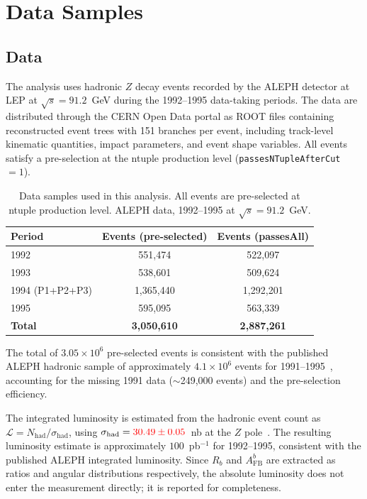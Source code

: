 \documentclass[11pt,a4paper]{article}
\newcommand{\external}[1]{\textcolor{red}{#1}}
\begin{document}
\section{Data Samples}
\label{sec:data}

\subsection{Data}

The analysis uses hadronic $Z$ decay events recorded by the ALEPH
detector at LEP at $\sqrt{s} = 91.2$~GeV during the 1992--1995 data-taking
periods.  The data are distributed through the CERN Open Data portal as
ROOT files containing reconstructed event trees with 151 branches per
event, including track-level kinematic quantities, impact parameters,
and event shape variables.  All events satisfy a pre-selection at the
ntuple production level (\texttt{passesNTupleAfterCut}~$= 1$).

\begin{table}[htbp]
\centering
\caption{Data samples used in this analysis.  All events are pre-selected
  at ntuple production level.  ALEPH data, 1992--1995 at
  $\sqrt{s} = 91.2$~GeV.}
\label{tbl:data}
\begin{tabular}{lcc}
\toprule
Period & Events (pre-selected) & Events (passesAll) \\
\midrule
1992              & 551,474   & 522,097   \\
1993              & 538,601   & 509,624   \\
1994 (P1+P2+P3)  & 1,365,440 & 1,292,201 \\
1995              & 595,095   & 563,339   \\
\midrule
\textbf{Total}    & \textbf{3,050,610} & \textbf{2,887,261} \\
\bottomrule
\end{tabular}
\end{table}

The total of $3.05 \times 10^6$ pre-selected events is consistent with
the published ALEPH hadronic sample of approximately $4.1 \times 10^6$
events for 1991--1995~\cite{ALEPH:AFBb}, accounting for the missing 1991
data ($\sim$249,000 events) and the pre-selection efficiency.

The integrated luminosity is estimated from the hadronic event count
as $\mathcal{L} = N_\mathrm{had} / \sigma_\mathrm{had}$, using
$\sigma_\mathrm{had} = \external{30.49 \pm 0.05}$~nb at the $Z$
pole~\cite{ALEPH:sigma_had}.  The resulting luminosity estimate is
approximately $100$~pb$^{-1}$ for 1992--1995, consistent with the
published ALEPH integrated luminosity.  Since $R_b$ and
$A_\mathrm{FB}^b$ are extracted as ratios and angular distributions
respectively, the absolute luminosity does not enter the measurement
directly; it is reported for completeness.
\end{document}
